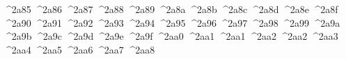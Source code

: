 {  ^^^^2a85%
  ^^^^2a86%
  ^^^^2a87%
  ^^^^2a88%
  ^^^^2a89%
  ^^^^2a8a%
  ^^^^2a8b%
  ^^^^2a8c%
  ^^^^2a8d%
  ^^^^2a8e%
  ^^^^2a8f%
  ^^^^2a90%
  ^^^^2a91%
  ^^^^2a92%
  ^^^^2a93%
  ^^^^2a94%
  ^^^^2a95%
  ^^^^2a96%
  ^^^^2a97%
  ^^^^2a98%
  ^^^^2a99%
  ^^^^2a9a%
  ^^^^2a9b%
  ^^^^2a9c%
  ^^^^2a9d%
  ^^^^2a9e%
  ^^^^2a9f%
  ^^^^2aa0%
  ^^^^2aa1%
  ^^^^2aa1%
  ^^^^2aa2%
  ^^^^2aa2%
  ^^^^2aa3%
  ^^^^2aa4%
  ^^^^2aa5%
  ^^^^2aa6%
  ^^^^2aa7%
  ^^^^2aa8%
}
